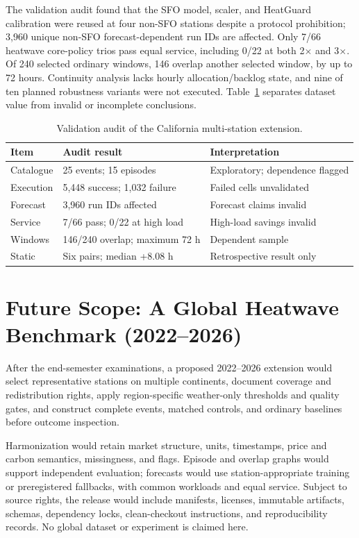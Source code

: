 \documentclass[pdflatex,sn-mathphys-num]{sn-jnl}
\begin{document}
The validation audit found that the SFO model, scaler, and HeatGuard calibration were reused at four non-SFO stations despite a protocol prohibition; 3,960 unique non-SFO forecast-dependent run IDs are affected. Only 7/66 heatwave core-policy trios pass equal service, including 0/22 at both 2$\times$ and 3$\times$. Of 240 selected ordinary windows, 146 overlap another selected window, by up to 72 hours. Continuity analysis lacks hourly allocation/backlog state, and nine of ten planned robustness variants were not executed. Table~\ref{tab:audit} separates dataset value from invalid or incomplete conclusions.

\begin{table}[t]
\caption{Validation audit of the California multi-station extension.}
\label{tab:audit}
\small
\begin{tabular}{@{}p{}p{}p{}@{}}
\toprule
\textbf{Item} & \textbf{Audit result} & \textbf{Interpretation} \\
\midrule
Catalogue & 25 events; 15 episodes & Exploratory; dependence flagged \\
Execution & 5,448 success; 1,032 failure & Failed cells unvalidated \\
Forecast & 3,960 run IDs affected & Forecast claims invalid \\
Service & 7/66 pass; 0/22 at high load & High-load savings invalid \\
Windows & 146/240 overlap; maximum 72 h & Dependent sample \\
Static & Six pairs; median +8.08 h & Retrospective result only \\
\bottomrule
\end{tabular}
\end{table}

\section{Future Scope: A Global Heatwave Benchmark (2022--2026)}\label{sec:future}

After the end-semester examinations, a proposed 2022--2026 extension would select representative stations on multiple continents, document coverage and redistribution rights, apply region-specific weather-only thresholds and quality gates, and construct complete events, matched controls, and ordinary baselines before outcome inspection.

Harmonization would retain market structure, units, timestamps, price and carbon semantics, missingness, and flags. Episode and overlap graphs would support independent evaluation; forecasts would use station-appropriate training or preregistered fallbacks, with common workloads and equal service. Subject to source rights, the release would include manifests, licenses, immutable artifacts, schemas, dependency locks, clean-checkout instructions, and reproducibility records. No global dataset or experiment is claimed here.
\end{document}
